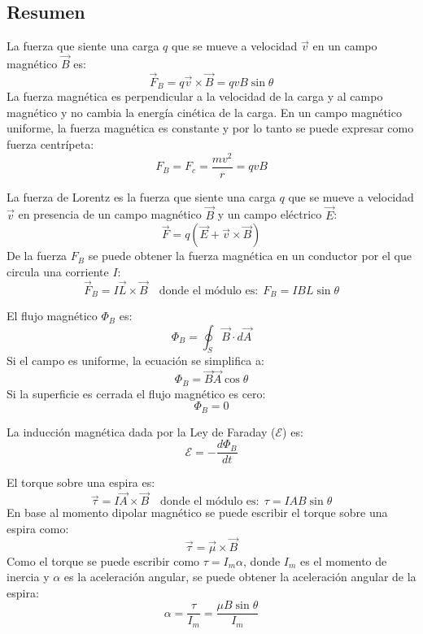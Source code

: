 \subsection{Resumen}

\begin{tcolorbox}[title=Campo magnético]
  La fuerza que siente una carga \(q\) que se mueve a velocidad \(\vec{v}\) en un campo magnético \(\vec{B}\) es:
  \[
    \vec{F}_B = q \vec{v} \times \vec{B} = qvB\sin\theta
  \]
  La fuerza magnética es perpendicular a la velocidad de la carga y al campo magnético y no cambia la energía cinética de la carga. En un campo magnético uniforme, la fuerza magnética es constante y por lo tanto se puede expresar como fuerza centrípeta:
  \[
    F_B = F_c = \frac{mv^2}{r} = qvB
  \]
\end{tcolorbox}

\begin{tcolorbox}[title=Fuerza de Lorentz]
  La fuerza de Lorentz es la fuerza que siente una carga \(q\) que se mueve a velocidad \(\vec{v}\) en presencia de un campo magnético \(\vec{B}\) y un campo eléctrico \(\vec{E}\):
  \[
    \vec{F} = q\left(\vec{E} + \vec{v} \times \vec{B}\right)
  \]
  De la fuerza \(F_B\) se puede obtener la fuerza magnética en un conductor por el que circula una corriente \(I\):
  \[
    \vec{F}_B = I\vec{L} \times \vec{B} \quad \text{donde el módulo es:} ~~ F_B = IBL\sin\theta
  \]
\end{tcolorbox}

\begin{tcolorbox}[title=Flujo Magnético]
  El flujo magnético \(\Phi_B\) es:
  \[
    \Phi_B = \oint_S \vec{B} \cdot d\vec{A}
  \]
  Si el campo es uniforme, la ecuación se simplifica a:
  \[
    \Phi_B = \vec{B}\vec{A}\cos\theta
  \]
  Si la superficie es cerrada el flujo magnético es cero:
  \[
    \Phi_B = 0
  \]
\end{tcolorbox}

\begin{tcolorbox}[title=Inducción magnética]
  La inducción magnética dada por la Ley de Faraday (\(\mathcal{E}\)) es:
  \[
    \mathcal{E} = -\frac{d\Phi_B}{dt}
  \]
\end{tcolorbox}

\begin{tcolorbox}[title=Torque sobre una espira]
  El torque sobre una espira es:
  \[
    \vec{\tau} = I\vec{A} \times \vec{B} \quad \text{donde el módulo es:} ~~ \tau = IAB\sin\theta
  \]
  En base al momento dipolar magnético se puede escribir el torque sobre una espira como:
  \[
    \vec{\tau} = \vec{\mu} \times \vec{B}
  \]
  Como el torque se puede escribir como \(\tau = I_m\alpha\), donde \(I_m\) es el momento de inercia y \(\alpha\) es la aceleración angular, se puede obtener la aceleración angular de la espira:
  \[
    \alpha = \frac{\tau}{I_m} = \frac{\mu B \sin\theta}{I_m}
  \]
\end{tcolorbox}

